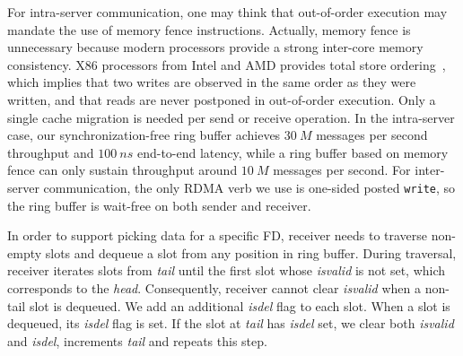 For intra-server communication, one may think that out-of-order execution may mandate the use of memory fence instructions. Actually, memory fence is unnecessary because modern processors provide a strong inter-core memory consistency. X86 processors from Intel and AMD provides total store ordering~\cite{sewell2010x86,intel-manual}, which implies that two writes are observed in the same order as they were written, and that reads are never postponed in out-of-order execution. Only a single cache migration is needed per send or receive operation. In the intra-server case, our synchronization-free ring buffer achieves $30~M$ messages per second throughput and $100~ns$ end-to-end latency, while a ring buffer based on memory fence can only sustain throughput around $10~M$ messages per second.
For inter-server communication, the only RDMA verb we use is one-sided posted \texttt{write}, so the ring buffer is wait-free on both sender and receiver.

In order to support picking data for a specific FD, receiver needs to traverse non-empty slots and dequeue a slot from any position in ring buffer. During traversal, receiver iterates slots from \textit{tail} until the first slot whose \textit{isvalid} is not set, which corresponds to the \textit{head}. Consequently, receiver cannot clear \textit{isvalid} when a non-tail slot is dequeued. We add an additional \textit{isdel} flag to each slot. When a slot is dequeued, its \textit{isdel} flag is set. If the slot at \textit{tail} has \textit{isdel} set, we clear both \textit{isvalid} and \textit{isdel}, increments \textit{tail} and repeats this step.




